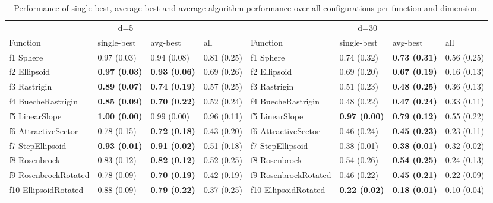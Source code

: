 \begin{table}
\caption{Performance of single-best, average best and average algorithm performance over all configurations per function and dimension.}
\begin{tabular}{llllllll}
\toprule
\multicolumn{4}{c}{d=5} & \multicolumn{4}{c}{d=30} \\
Function & single-best & avg-best & all & Function & single-best & avg-best & all \\
\midrule
f1 Sphere & 0.97 (0.03) & 0.94 (0.08) & 0.81 (0.25) & f1 Sphere & 0.74 (0.32) & \textbf{0.73 (0.31)} & 0.56 (0.25) \\
f2 Ellipsoid & \textbf{0.97 (0.03)} & \textbf{0.93 (0.06)} & 0.69 (0.26) & f2 Ellipsoid & 0.69 (0.20) & \textbf{0.67 (0.19)} & 0.16 (0.13) \\
f3 Rastrigin & \textbf{0.89 (0.07)} & \textbf{0.74 (0.19)} & 0.57 (0.25) & f3 Rastrigin & 0.51 (0.23) & \textbf{0.48 (0.25)} & 0.36 (0.13) \\
f4 BuecheRastrigin & \textbf{0.85 (0.09)} & \textbf{0.70 (0.22)} & 0.52 (0.24) & f4 BuecheRastrigin & 0.48 (0.22) & \textbf{0.47 (0.24)} & 0.33 (0.11) \\
f5 LinearSlope & \textbf{1.00 (0.00)} & 0.99 (0.00) & 0.96 (0.11) & f5 LinearSlope & \textbf{0.97 (0.00)} & \textbf{0.79 (0.12)} & 0.55 (0.22) \\
f6 AttractiveSector & 0.78 (0.15) & \textbf{0.72 (0.18)} & 0.43 (0.20) & f6 AttractiveSector & 0.46 (0.24) & \textbf{0.45 (0.23)} & 0.23 (0.11) \\
f7 StepEllipsoid & \textbf{0.93 (0.01)} & \textbf{0.91 (0.02)} & 0.51 (0.18) & f7 StepEllipsoid & 0.38 (0.01) & \textbf{0.38 (0.01)} & 0.32 (0.02) \\
f8 Rosenbrock & 0.83 (0.12) & \textbf{0.82 (0.12)} & 0.52 (0.25) & f8 Rosenbrock & 0.54 (0.26) & \textbf{0.54 (0.25)} & 0.24 (0.13) \\
f9 RosenbrockRotated & 0.78 (0.09) & \textbf{0.70 (0.19)} & 0.42 (0.19) & f9 RosenbrockRotated & 0.46 (0.22) & \textbf{0.45 (0.21)} & 0.22 (0.09) \\
f10 EllipsoidRotated & 0.88 (0.09) & \textbf{0.79 (0.22)} & 0.37 (0.25) & f10 EllipsoidRotated & \textbf{0.22 (0.02)} & \textbf{0.18 (0.01)} & 0.10 (0.04) \\

\end{tabular}
\end{table}
